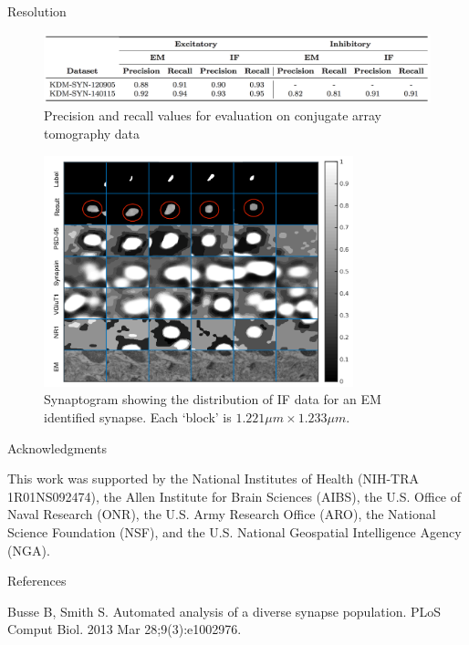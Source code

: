 \documentclass[final, table]{beamer}
\newlength{\onecolwid}
\begin{document}
\begin{frame}[t]
\begin{columns}[t]
\begin{column}{\onecolwid}
\begin{block}{Resolution}
\begin{figure}[!h]
\centering
\includegraphics[width=1\textwidth]{figs/table1}
\caption{Precision and recall values for evaluation on conjugate array tomography data}
\label{fig:pr_curves}
\end{figure}


\begin{figure}[!h]
\centering
\includegraphics[width=0.8\textwidth]{figs/synaptogramSilane}
\caption{Synaptogram showing the distribution of IF data for an EM identified synapse.  Each `block' is $1.221 \mu m \times 1.233 \mu m$. }
\label{fig:synaptogramSilane}
\end{figure}






\end{block} 

\begin{block}{Acknowledgments} 

\tiny{This work was supported by the National Institutes of Health (NIH-TRA 1R01NS092474), the Allen Institute for Brain Sciences (AIBS), the U.S. Office of Naval Research (ONR), the U.S. Army Research Office (ARO), the National Science Foundation (NSF), and the U.S. National Geospatial Intelligence Agency (NGA).}
\end{block} 


\vspace{-0.05in}
\begin{block}{References}
\tiny{
\begin{thebibliography}{99}
Busse B, Smith S. Automated analysis of a diverse synapse population. PLoS Comput Biol. 2013 Mar 28;9(3):e1002976.


\end{thebibliography}}
\end{block}
\end{column}
\end{columns}
\end{frame}
\end{document}
